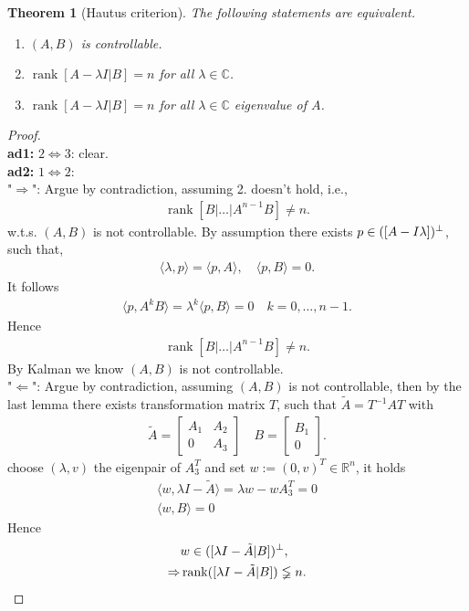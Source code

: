 \documentclass[a4paper,11pt,fleqn]{book}
\newtheorem{theorem}{Theorem}[section]
\theoremstyle{definition}
\theoremstyle{remark}
\let\ran\relax
\DeclareMathOperator{\ran}{ran}
\DeclareMathOperator*{\rank}{rank}
\begin{document}
\begin{theorem}[Hautus criterion]
	The following statements are equivalent. 
	\begin{enumerate}
		\item $(A, B)$ is controllable.
		\item $\rank[A - \lambda I | B] = n $ for all $\lambda \in \mathbb{C}$.
		\item $\rank[A - \lambda I | B] = n $ for all $\lambda \in \mathbb{C}$ eigenvalue of $A$. 
	\end{enumerate}
\end{theorem}
\begin{proof}
\quad\\
\textbf{ad1:} $2 \Leftrightarrow 3$: clear. \\
\textbf{ad2:} $1 \Leftrightarrow 2$: \\
"$\Rightarrow$": Argue by contradiction, assuming 2. doesn't hold, i.e., 
\begin{align*}
	\rank[B|\dots|A^{n -1}B] \neq n.
\end{align*}
w.t.s. $(A, B)$ is not controllable. 
By assumption there exists $p \in (\ran[A - I\lambda])^\perp $, such that, 
\begin{align*}
	\langle \lambda , p \rangle = \langle p, A \rangle , \quad \langle p, B \rangle = 0. 
\end{align*}
It follows
\begin{align*}
	\langle p, A^{k}B \rangle = \lambda^k \langle p, B\rangle =  0 \quad k = 0, \dots, n - 1. 
\end{align*}
Hence
\begin{align*}
	\rank [B|\dots|A^{n -1}B] \neq n.
\end{align*}
By Kalman we know $(A, B)$ is not controllable. 
 \\
"$\Leftarrow$":  Argue by contradiction, assuming $(A, B)$ is not controllable, then by the last lemma there exists transformation matrix $T$, such that $\tilde{A} = T^{-1} A T$ with 
\begin{align*}
	\tilde{A} = 
	\begin{bmatrix}
		A_1 & A_2\\
		0 & A_3
	\end{bmatrix}
	\quad 
	B = 
	\begin{bmatrix}
		B_1\\
		0
	\end{bmatrix}.
\end{align*} 
choose $(\lambda, v)$ the eigenpair of $A_3^T$ and set $w:= (0, v)^T \in \mathbb{R}^n$, it holds
\begin{align*}
	\langle w, \lambda I - \tilde{A} \rangle  = \lambda w - w A_3^T = 0\\
	\langle w, B \rangle = 0  
\end{align*}
Hence
\begin{align*}
	&w \in \ran ([\lambda I - \tilde{A}|B])^\perp, \\
	\Rightarrow & \rank ([\lambda I - \tilde{A}|B]) \lneqq n . 
\end{align*}
\end{proof}
\end{document}

